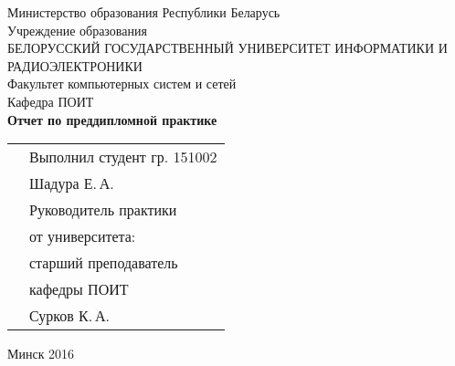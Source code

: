 \begin{titlepage}

    \begin{center}
        Министерство образования Республики Беларусь \\[0.4cm]

        Учреждение образования \\

        \MakeUppercase{БЕЛОРУССКИЙ ГОСУДАРСТВЕННЫЙ УНИВЕРСИТЕТ ИНФОРМАТИКИ И РАДИОЭЛЕКТРОНИКИ} \\[0.4cm]

        Факультет компьютерных систем и сетей \\[0.4cm]

        Кафедра ПОИТ \\[3.4cm] %

        {\large\bfseries{Отчет по преддипломной практике}} \\[2cm]

        \noindent






        \begin{tabular}{p{}p{}}
            & Выполнил студент гр. 151002 \\
            & Шадура Е.\,А. \\[1cm]

            & Руководитель практики \\
            & от университета: \\
            & старший преподаватель \\
            & кафедры ПОИТ \\
            & Сурков К.\,А. \\
        \end{tabular}

        \vfill

        {\normalsize Минск 2016}
    \end{center}

\end{titlepage}
